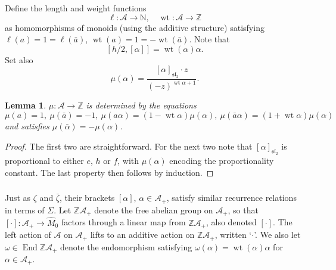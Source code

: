 \documentclass{article}
\def\fsl{\mathfrak{sl}}
\def\sA{\mathcal{A}}
\def\ZZ{\mathbb{Z}}
\def\NN{\mathbb{N}}
\DeclareMathOperator{\End}{\mathrm{End}}
\DeclareMathOperator{\wt}{\mathrm{wt}}
\newtheorem{lem}{Lemma}
\theoremstyle{definition}
\begin{document}
\subsubsection{}
Define the length and weight functions
$$ \ell : \sA \to \NN,\quad \wt : \sA \to \ZZ $$
as homomorphisms of monoids (using the additive structure)
satisfying $\ell(a) = 1 = \ell(\bar a)$, $\wt(a) = 1 = -\wt(\bar a)$.
Note that
$$ [h/2, [\alpha]] = \wt(\alpha) \alpha. $$
Set also
$$ \mu(\alpha) = \frac{[\alpha]_{\fsl_2} \cdot z}{(-z)^{\wt\alpha + 1}}. $$
\begin{lem}\label{lem:mu}
        $\mu : \sA \to \ZZ$ is determined by the equations
        $$ \mu(a)=1,\ \mu(\bar a)=-1,\ \mu(a\alpha) = (1 - \wt \alpha)\mu(\alpha),\ \mu(\bar a \alpha) = (1 + \wt\alpha)\mu(\alpha)$$
        and satisfies $\mu(\bar\alpha) = -\mu(\alpha)$.
\end{lem}
\begin{proof}
        The first two are straightforward. For the next two 
        note that $[\alpha]_{\fsl_2}$
        is proportional to either $e$, $h$ or $f$, with $\mu(\alpha)$
        encoding the proportionality constant. The last property then follows by induction. 
\end{proof}

\subsubsection{}
Just as $\zeta$ and $\bar\zeta$, their brackets $[\alpha]$, $\alpha\in\sA_+$,
satisfy similar recurrence relations in terms of $\Sigma$. 
Let $\ZZ\sA_+$ denote the free abelian group on $\sA_+$,
so that $[\cdot] : \sA_+ \to \hat M_0$ factors through
a linear map from $\ZZ\sA_+$, also denoted $[\cdot]$.
The left action of $\sA$ on $\sA_+$
lifts to an additive action on $\ZZ\sA_+$, written `$\cdot$'.
We also let $\omega \in \End\ZZ\sA_+$ denote the endomorphism
satisfying $\omega(\alpha) = \wt(\alpha) \alpha$
for $\alpha\in\sA_+$.
\end{document}
